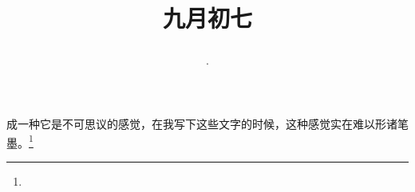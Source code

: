 \title{\date[d=9,m=10,y=2024][year:cn-y,年,month:cn,day:cn,日,·,weekday]·九月初七 }
成一种它是不可思议的感觉，在我写下这些文字的时候，这种感觉实在难以形诸笔墨。\footnote{ }

